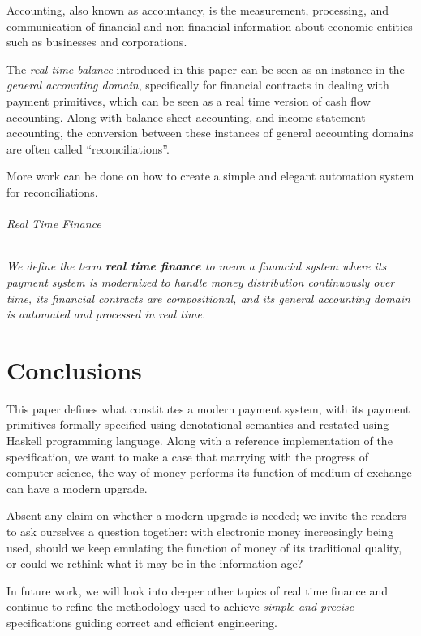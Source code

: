 \begin{displayquote}
Accounting, also known as accountancy, is the measurement, processing, and communication of
financial and non-financial information about economic entities such as businesses and
corporations. 
\end{displayquote}

The \textit{real time balance} introduced in this paper can be seen as an instance in
the \textit{general accounting domain}, specifically for financial contracts in dealing with payment
primitives, which can be seen as a real time version of cash flow accounting. Along with balance
sheet accounting, and income statement accounting, the conversion between these instances of general
accounting domains are often called ``reconciliations''.

More work can be done on how to create a simple and elegant automation system for reconciliations.

\paragraph{Real Time Finance}

\emph{
We define the term \textbf{real time finance} to mean a financial system where its payment system is
modernized to handle money distribution continuously over time, its financial contracts are
compositional, and its general accounting domain is automated and processed in real time.  }

\part*{Conclusions}

This paper defines what constitutes a modern payment system, with its payment primitives formally
specified using denotational semantics and restated using Haskell programming language. Along with a
reference implementation of the specification, we want to make a case that marrying with the
progress of computer science, the way of money performs its function of medium of exchange can have
a modern upgrade.

Absent any claim on whether a modern upgrade is needed; we invite the readers to ask ourselves a
question together: with electronic money increasingly being used, should we keep emulating the
function of money of its traditional quality, or could we rethink what it may be in the information
age?

In future work, we will look into deeper other topics of real time finance and continue to refine
the methodology used to achieve \textit{simple and precise} specifications guiding correct and
efficient engineering.

\newpage
\printbibliography{}


